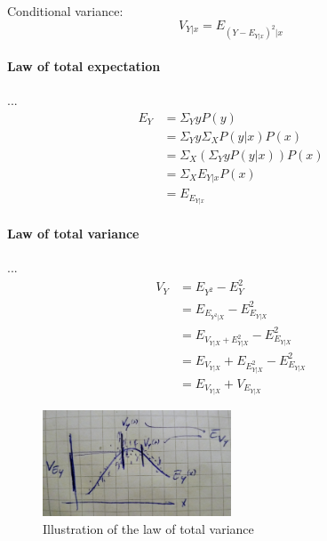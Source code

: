 \begin{definition} \label{conditionalVariance}
    Conditional variance: 
    $$ V_{Y|x} = E_{(Y - E_{Y|x})^2 | x} $$ 
\end{definition}

\paragraph{Law of total expectation} ...
\begin{equation} \label{lawOfTotalExpectation}
    \begin{aligned}
        E_Y &= \Sigma_Y y P(y) \\
            &= \Sigma_Y y \Sigma_X P(y|x) P(x) \\
            &= \Sigma_X (\Sigma_Y y P(y|x)) P(x) \\
            &= \Sigma_X E_{Y|x} P(x) \\
            &= E_{E_{Y|x}}
    \end{aligned}
\end{equation}

\paragraph{Law of total variance} ...
\begin{equation} \label{lawOfTotalVariance}
    \begin{aligned}
        V_Y &= E_{Y^2} - E_Y^2 \\
            &= E_{E_{Y^2 | X}} - E^2_{E_{Y|X}} \\
            &= E_{  V_{Y|X} + E^2_{Y|X}  } - E^2_{E_{Y|X}} \\
            &= E_{V_{Y|X}} + E_{E^2_{Y|X}} - E^2_{E_{Y|X}} \\
            &= E_{V_{Y|X}} + V_{E_{Y|X}}
    \end{aligned}
\end{equation}


\begin{figure}[h]
    \caption{Illustration of the law of total variance}
    \centering
      \includegraphics[width=0.5\textwidth]{images/law_of_total_variance.jpg}
\end{figure}
 
